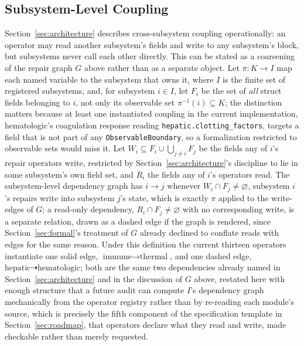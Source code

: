 \documentclass[11pt]{article}
\begin{document}
\subsection{Subsystem-Level Coupling}

Section~\ref{sec:architecture} describes cross-subsystem coupling operationally: an operator may read another subsystem's fields and write to any subsystem's block, but subsystems never call each other directly. This can be stated as a coarsening of the repair graph $G$ above rather than as a separate object. Let $\pi : K \rightarrow I$ map each named variable to the subsystem that owns it, where $I$ is the finite set of registered subsystems, and, for subsystem $i \in I$, let $F_i$ be the set of \emph{all} struct fields belonging to $i$, not only its observable set $\pi^{-1}(i) \subseteq K$; the distinction matters because at least one instantiated coupling in the current implementation, hematologic's coagulation response reading \texttt{hepatic.clotting\_factors}, targets a field that is not part of any \texttt{ObservableBoundary}, so a formalization restricted to observable sets would miss it. Let $W_i \subseteq F_i \cup \bigcup_{j \neq i} F_j$ be the fields any of $i$'s repair operators write, restricted by Section~\ref{sec:architecture}'s discipline to lie in some subsystem's own field set, and $R_i$ the fields any of $i$'s operators read. The subsystem-level dependency graph has $i \rightarrow j$ whenever $W_i \cap F_j \neq \varnothing$, subsystem $i$'s repairs write into subsystem $j$'s state, which is exactly $\pi$ applied to the write-edges of $G$; a read-only dependency, $R_i \cap F_j \neq \varnothing$ with no corresponding write, is a separate relation, drawn as a dashed edge if the graph is rendered, since Section~\ref{sec:formal}'s treatment of $G$ already declined to conflate reads with edges for the same reason. Under this definition the current thirteen operators instantiate one solid edge, $\text{immune} \rightarrow \text{thermal}$, and one dashed edge, $\text{hepatic} \dashrightarrow \text{hematologic}$; both are the same two dependencies already named in Section~\ref{sec:architecture} and in the discussion of $G$ above, restated here with enough structure that a future audit can compute $I$'s dependency graph mechanically from the operator registry rather than by re-reading each module's source, which is precisely the fifth component of the specification template in Section~\ref{sec:roadmap}, that operators declare what they read and write, made checkable rather than merely requested.
\end{document}
